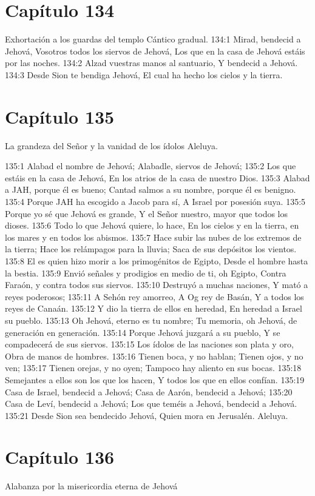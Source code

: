 \section*{Capítulo 134}
Exhortación a los guardas del templo 
Cántico gradual. 
134:1 Mirad, bendecid a Jehová, 
Vosotros todos los siervos de Jehová, 
Los que en la casa de Jehová estáis por las noches. 
134:2 Alzad vuestras manos al santuario, 
Y bendecid a Jehová. 
134:3 Desde Sion te bendiga Jehová, 
El cual ha hecho los cielos y la tierra. 
\section*{Capítulo 135}
La grandeza del Señor y la vanidad de los ídolos 
Aleluya. 
 
135:1 Alabad el nombre de Jehová; 
Alabadle, siervos de Jehová; 
135:2 Los que estáis en la casa de Jehová, 
En los atrios de la casa de nuestro Dios. 
135:3 Alabad a JAH, porque él es bueno; 
Cantad salmos a su nombre, porque él es benigno. 
135:4 Porque JAH ha escogido a Jacob para sí, 
A Israel por posesión suya. 
135:5 Porque yo sé que Jehová es grande, 
Y el Señor nuestro, mayor que todos los dioses. 
135:6 Todo lo que Jehová quiere, lo hace, 
En los cielos y en la tierra, en los mares y en todos los abismos. 
135:7 Hace subir las nubes de los extremos de la tierra; 
Hace los relámpagos para la lluvia; 
Saca de sus depósitos los vientos. 
135:8 El es quien hizo morir a los primogénitos de Egipto, 
Desde el hombre hasta la bestia. 
135:9 Envió señales y prodigios en medio de ti, oh Egipto, 
Contra Faraón, y contra todos sus siervos. 
135:10 Destruyó a muchas naciones, 
Y mató a reyes poderosos; 
135:11 A Sehón rey amorreo, 
A Og rey de Basán, 
Y a todos los reyes de Canaán. 
135:12 Y dio la tierra de ellos en heredad, 
En heredad a Israel su pueblo. 
135:13 Oh Jehová, eterno es tu nombre; 
Tu memoria, oh Jehová, de generación en generación. 
135:14 Porque Jehová juzgará a su pueblo, 
Y se compadecerá de sus siervos. 
135:15 Los ídolos de las naciones son plata y oro, 
Obra de manos de hombres. 
135:16 Tienen boca, y no hablan; 
Tienen ojos, y no ven; 
135:17 Tienen orejas, y no oyen; 
Tampoco hay aliento en sus bocas. 
135:18 Semejantes a ellos son los que los hacen, 
Y todos los que en ellos confían. 
135:19 Casa de Israel, bendecid a Jehová; 
Casa de Aarón, bendecid a Jehová; 
135:20 Casa de Leví, bendecid a Jehová; 
Los que teméis a Jehová, bendecid a Jehová. 
135:21 Desde Sion sea bendecido Jehová, 
Quien mora en Jerusalén. 
Aleluya. 
\section*{Capítulo 136}
Alabanza por la misericordia eterna de Jehová 
 
